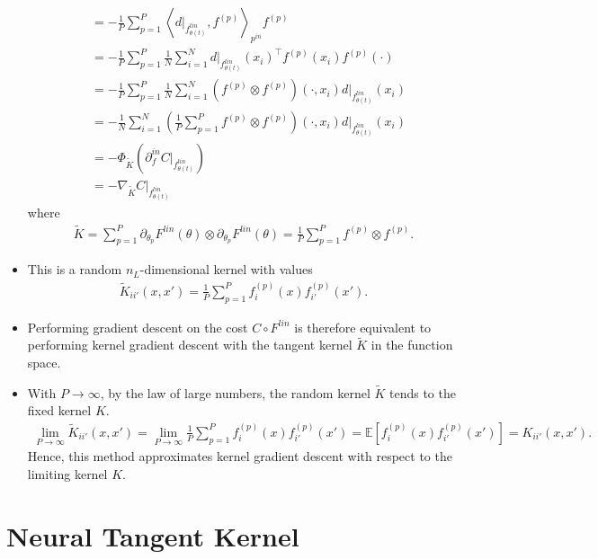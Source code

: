 \documentclass[10pt]{article}
\newcommand{\EE}{\mathbb{E}}
\newcommand{\inner}[2]{\left\langle #1, #2 \right\rangle}
\newcommand{\paran}[1]{{( #1 )}}
\newcommand{\pin}{{p^{in}}}
\newcommand{\din}{\partial^{in}}
\begin{document}
\begin{itemize}
\begin{align*}
&= -\frac{1}{P} \sum_{p = 1}^P \inner{d|_{f^{lin}_{\theta(t)}}}{f^\paran{p}}_{\pin} f^\paran{p} \\
&= -\frac{1}{P} \sum_{p = 1}^P \frac{1}{N} \sum_{i = 1}^N d|_{f^{lin}_{\theta(t)}}(x_i)^\top f^\paran{p}(x_i) f^\paran{p}(\cdot) \\
&= -\frac{1}{P} \sum_{p = 1}^P \frac{1}{N} \sum_{i = 1}^N (f^\paran{p} \otimes f^\paran{p})(\cdot,x_i) d|_{f^{lin}_{\theta(t)}}(x_i) \\
&= -\frac{1}{N} \sum_{i = 1}^N \left( \frac{1}{P} \sum_{p = 1}^P f^\paran{p} \otimes f^\paran{p} \right)(\cdot,x_i) d|_{f^{lin}_{\theta(t)}}(x_i) \\
&= -\Phi_{\tilde{K}}(\din_f C|_{f^{lin}_{\theta(t)}}) \\
&= -\nabla_{\tilde{K}} C|_{f^{lin}_{\theta(t)}}
\end{align*}
where
\begin{align*}
\tilde{K} = \sum_{p = 1}^P \partial_{\theta_p} F^{lin}(\theta) \otimes \partial_{\theta_p} F^{lin}(\theta) = \frac{1}{P} \sum_{p = 1}^P f^\paran{p} \otimes f^\paran{p}.
\end{align*}
\item This is a random $n_L$-dimensional kernel with values
\begin{align*}
\tilde{K}_{ii'}(x,x') = \frac{1}{P} \sum_{p = 1}^P f^\paran{p}_i(x) f^\paran{p}_{i'}(x').
\end{align*}
\item Performing gradient descent on the cost $C \circ F^{lin}$ is therefore equivalent to performing kernel gradient descent with the tangent kernel $\tilde{K}$ in the function space.
\item With $P \rightarrow \infty$, by the law of large numbers, the random kernel $\tilde{K}$ tends to the fixed kernel $K$.
\begin{align*}
\lim_{P \rightarrow \infty} \tilde{K}_{ii'}(x,x') = \lim_{P \rightarrow \infty} \frac{1}{P} \sum_{p = 1}^P f^\paran{p}_i(x) f^\paran{p}_{i'}(x') = \EE[f^\paran{p}_i(x) f^\paran{p}_{i'}(x')] = K_{ii'}(x,x').
\end{align*}
Hence, this method approximates kernel gradient descent with respect to the limiting kernel $K$.
\end{itemize}

\section{Neural Tangent Kernel}
\end{document}
